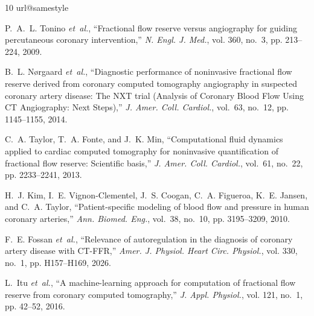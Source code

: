 \documentclass[journal,twoside,web]{ieeecolor}
\begin{document}
\begin{thebibliography}{10}
\providecommand{\url}[1]{#1}
\csname url@samestyle\endcsname
\providecommand{\newblock}{\relax}
\providecommand{\bibinfo}[2]{#2}
\providecommand{\BIBentrySTDinterwordspacing}{\spaceskip=0pt\relax}
\providecommand{\BIBentryALTinterwordstretchfactor}{4}
\providecommand{\BIBentryALTinterwordspacing}{\spaceskip=\fontdimen2\font plus
\BIBentryALTinterwordstretchfactor\fontdimen3\font minus
  \fontdimen4\font\relax}
\providecommand{\BIBforeignlanguage}[2]{{%
\expandafter\ifx\csname l@#1\endcsname\relax
\typeout{** WARNING: IEEEtran.bst: No hyphenation pattern has been}%
\typeout{** loaded for the language `#1'. Using the pattern for}%
\typeout{** the default language instead.}%
\else
\language=\csname l@#1\endcsname
\fi
#2}}
\providecommand{\BIBdecl}{\relax}
\BIBdecl

P.~A.~L. Tonino \emph{et~al.}, ``Fractional flow reserve versus angiography for
  guiding percutaneous coronary intervention,'' \emph{N. Engl. J. Med.}, vol.
  360, no.~3, pp. 213--224, 2009.

B.~L. Nørgaard \emph{et~al.}, ``Diagnostic performance of noninvasive
  fractional flow reserve derived from coronary computed tomography angiography
  in suspected coronary artery disease: {T}he {NXT} trial ({A}nalysis of
  {C}oronary {B}lood {F}low {U}sing {CT} {A}ngiography: {N}ext {S}teps),''
  \emph{J. Amer. Coll. Cardiol.}, vol.~63, no.~12, pp. 1145--1155, 2014.

C.~A. Taylor, T.~A. Fonte, and J.~K. Min, ``Computational fluid dynamics
  applied to cardiac computed tomography for noninvasive quantification of
  fractional flow reserve: {S}cientific basis,'' \emph{J. Amer. Coll.
  Cardiol.}, vol.~61, no.~22, pp. 2233--2241, 2013.

H.~J. Kim, I.~E. Vignon-Clementel, J.~S. Coogan, C.~A. Figueroa, K.~E. Jansen,
  and C.~A. Taylor, ``Patient-specific modeling of blood flow and pressure in
  human coronary arteries,'' \emph{Ann. Biomed. Eng.}, vol.~38, no.~10, pp.
  3195--3209, 2010.

F.~E. Fossan \emph{et~al.}, ``Relevance of autoregulation in the diagnosis of
  coronary artery disease with {CT-FFR},'' \emph{Amer. J. Physiol. Heart Circ.
  Physiol.}, vol. 330, no.~1, pp. H157--H169, 2026.

L.~Itu \emph{et~al.}, ``A machine-learning approach for computation of
  fractional flow reserve from coronary computed tomography,'' \emph{J. Appl.
  Physiol.}, vol. 121, no.~1, pp. 42--52, 2016.


\end{thebibliography}
\end{document}

